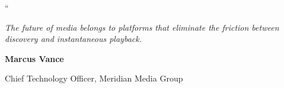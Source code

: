 \documentclass[aspectratio=169,11pt]{beamer}
\begin{document}
{
\begin{frame}[plain]
  \vspace*{28pt}
  \begin{center}
    {\fontsize{48pt}{48pt}\selectfont \color{accentcyan}“} \par
    \vspace{-16pt}
    \begin{minipage}{0.85\textwidth}
      \centering
      {\fontsize{18pt}{24pt}\selectfont \color{white}\itshape The future of media belongs to platforms that eliminate the friction between discovery and instantaneous playback.}
    \end{minipage} \par
    \vspace{18pt}
    \vspace{12pt}
    
    {\bfseries\color{white} Marcus Vance} \par
    {\small\color{textlight} Chief Technology Officer, Meridian Media Group}
  \end{center}
\end{frame}
}
\end{document}
